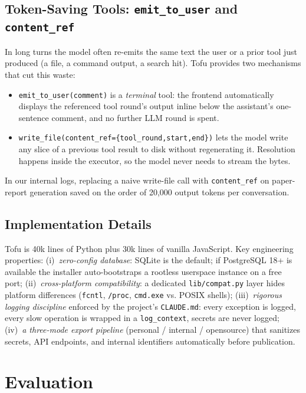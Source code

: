 \documentclass[11pt]{article}
\begin{document}
\subsection{Token-Saving Tools: \texttt{emit\_to\_user} and \texttt{content\_ref}}
\label{sec:tokensaving}

In long turns the model often re-emits the same text the user or a prior
tool just produced (a file, a command output, a search hit). Tofu
provides two mechanisms that cut this waste:

\begin{itemize}
\itemsep 1pt
\item \texttt{emit\_to\_user(comment)} is a \emph{terminal} tool: the
  frontend automatically displays the referenced tool round's output
  inline below the assistant's one-sentence comment, and no further LLM
  round is spent.
\item \texttt{write\_file(content\_ref=\{tool\_round,start,end\})} lets
  the model write any slice of a previous tool result to disk without
  regenerating it. Resolution happens inside the executor, so the model
  never needs to stream the bytes.
\end{itemize}

In our internal logs, replacing a naive write-file call with
\texttt{content\_ref} on paper-report generation saved on the order of
20{,}000 output tokens per conversation.

\subsection{Implementation Details}

Tofu is 40k lines of Python plus 30k lines of vanilla JavaScript. Key
engineering properties: (i)~\emph{zero-config database}: SQLite is the
default; if PostgreSQL 18+ is available the installer auto-bootstraps a
rootless userspace instance on a free port;
(ii)~\emph{cross-platform compatibility}: a dedicated \texttt{lib/compat.py}
layer hides platform differences (\texttt{fcntl}, \texttt{/proc},
\texttt{cmd.exe} vs. POSIX shells);
(iii)~\emph{rigorous logging discipline} enforced by the project's
\texttt{CLAUDE.md}: every exception is logged, every slow operation is
wrapped in a \texttt{log\_context}, secrets are never logged;
(iv)~\emph{a three-mode export pipeline} (personal / internal /
opensource) that sanitizes secrets, API endpoints, and internal
identifiers automatically before publication.

\section{Evaluation}
\end{document}
